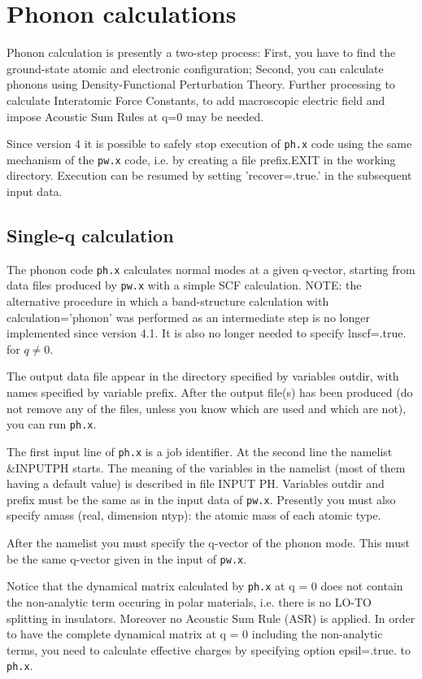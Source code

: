 \documentclass[12pt,a4paper]{article}
\def\pw.x{\texttt{pw.x}}
\def\ph.x{\texttt{ph.x}}
\begin{document}
\section{Phonon calculations}

Phonon calculation is presently a two-step process:
First, you have to find the ground-state atomic and electronic configuration;
Second, you can calculate phonons using Density-Functional Perturbation Theory.
Further processing to calculate Interatomic Force Constants, to add macroscopic
electric field and impose Acoustic Sum Rules at q=0 may be needed.

Since version 4 it is possible to safely stop execution of \ph.x code using
the same mechanism of the \pw.x code, i.e. by creating a file prefix.EXIT in the 
working directory. Execution can be resumed by setting 'recover=.true.' in the
subsequent input data.

\subsection{Single-q calculation}

The phonon code \ph.x calculates normal modes at a given q-vector, starting
from data files produced by \pw.x with a simple SCF calculation.
NOTE: the alternative procedure in which a band-structure calculation 
with calculation='phonon' was performed as an intermediate step is no
longer implemented since version 4.1. It is also no longer needed to
specify lnscf=.true. for $q\ne 0$.

The output data file appear in the directory specified by variables outdir,
with names specified by variable prefix. After the output file(s) has been
produced (do not remove any of the files, unless you know which are used
and which are not), you can run \ph.x.
    
The first input line of \ph.x is a job identifier. At the second line the
namelist \&INPUTPH starts. The meaning of the variables in the namelist
(most of them having a default value) is described in file INPUT PH. Variables
outdir and prefix must be the same as in the input data of \pw.x. Presently
you must also specify amass (real, dimension ntyp): the atomic mass of each
atomic type.

After the namelist you must specify the q-vector of the phonon mode.
This must be the same q-vector given in the input of \pw.x.
    
Notice that the dynamical matrix calculated by \ph.x at q = 0 does not
contain the non-analytic term occuring in polar materials, i.e. there is no
LO-TO splitting in insulators. Moreover no Acoustic Sum Rule (ASR) is
applied. In order to have the complete dynamical matrix at q = 0 including
the non-analytic terms, you need to calculate effective charges by specifying
option epsil=.true. to \ph.x.
\end{document}
